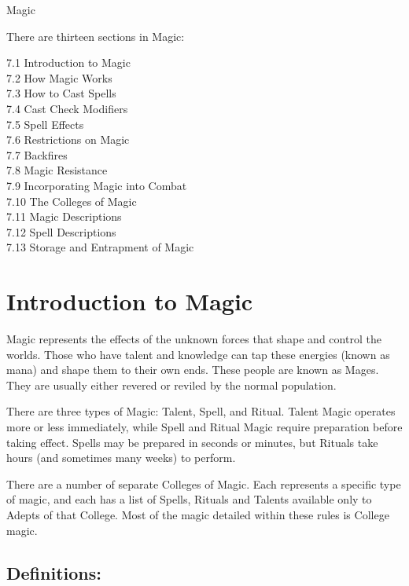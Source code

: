 \begin{Chapter}{Magic}

There are thirteen sections in Magic: 

7.1 Introduction to Magic \\
7.2 How Magic Works \\
7.3 How to Cast Spells \\
7.4 Cast Check Modifiers \\
7.5 Spell Effects \\
7.6 Restrictions on Magic \\
7.7 Backfires \\
7.8 Magic Resistance \\
7.9 Incorporating Magic into Combat \\
7.10 The Colleges of Magic \\
7.11 Magic Descriptions \\
7.12 Spell Descriptions \\
7.13 Storage and Entrapment of Magic \\


\section{Introduction to Magic}

Magic represents the effects of the unknown forces that shape and
control the worlds. Those who have talent and knowledge can tap these
energies (known as mana) and shape them to their own ends. These
people are known as Mages. They are usually either revered or reviled
by the normal population.

There are three types of Magic: Talent, Spell, and Ritual.  Talent
Magic operates more or less immediately, while Spell and Ritual Magic
require preparation before taking effect.  Spells may be prepared in
seconds or minutes, but Rituals take hours (and sometimes many weeks)
to perform.

There are a number of separate Colleges of Magic.  Each represents a
specific type of magic, and each has a list of Spells, Rituals and
Talents available only to Adepts of that College. Most of the magic
detailed within these rules is College magic.

\subsection{Definitions:}

\begin{Description}


\end{Description}
\end{Chapter}
